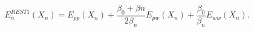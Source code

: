 \begin{center}
    \begin{equation}
        E_{n}^{REST1}(X_{n}) =  E_{pp}(X_{n}) + \frac{\beta_{0}+\beta{n}}{2\beta_{n}} E_{pw}(X_{n}) +  \frac{\beta_{0}}{\beta_{n}}E_{ww} (X_{n}).
        \label{eq:rest1_hamiltonian}
    \end{equation}
\end{center}